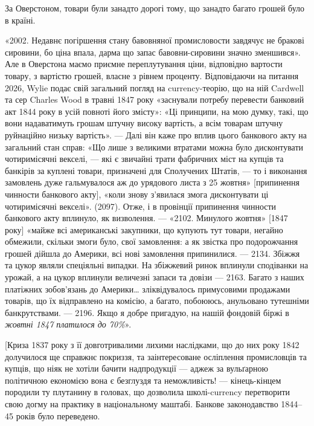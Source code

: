 За Оверстоном, товари були занадто дорогі тому, що занадто багато грошей
було в країні.

«2002. Недавнє погіршення стану бавовняної промисловости завдячує не
бракові сировини, бо ціна впала, дарма що запас бавовни-сировини значно
зменшився». Але в Оверстона маємо приємне переплутування ціни, відповідно
вартости товару, з вартістю грошей, власне з рівнем проценту. Відповідаючи на
питання 2026, Wylie подає свій загальний погляд на currency-теорію, що на
ній Cardwell та сер Charles Wood в травні 1847 року «заснували потребу перевести
банковий акт 1844 року в усій повноті його змісту»: «Ці принципи, на
мою думку, такі, що вони надаватимуть грошам штучну високу вартість, а всім
товарам штучну руйнаційно низьку вартість». — Далі він каже про вплив цього
банкового акту на загальний стан справ: «Що лише з великими втратами можна
було дисконтувати чотиримісячні векселі, — які є звичайні трати фабричних міст
на купців та банкірів за куплені товари, призначені для Сполучених Штатів, —
то і виконання замовлень дуже гальмувалося аж до урядового листа з 25 жовтня»
[припинення чинности банкового акту], «коли знову з’явилася змога дисконтувати
ці чотиримісячні векселі». (2097). Отже, і в провінції припинення чинности
банкового акту вплинуло, як визволення. — «2102. Минулого жовтня»
[1847 року] «майже всі американські закупники, що купують тут товари, негайно
обмежили, скільки змоги було, свої замовлення: а як звістка про подорожчання
грошей дійшла до Америки, всі нові замовлення припинилися. — 2134.
Збіжжя та цукор являли спеціяльні випадки. На збіжжевий ринок вплинули
сподіванки на урожай, а на цукор вплинули величезні запаси та довізи — 2163.
Багато з наших платіжних зобов’язань до Америки\dots{} зліквідувалось примусовими
продажами товарів, що їх відправлено на комісію, а багато, побоююсь,
анульовано тутешніми банкрутствами. — 2196. Якщо я добре пригадую, на нашій
фондовій біржі в \emph{жовтні 1847 платилося до 70\%}».

[Криза 1837 року з її довготривалими лихими наслідками, що до них
року 1842 долучилося ще справжнє покриззя, та заінтересоване осліплення
промисловців та купців, що ніяк не хотіли бачити надпродукції — аджеж за
вульґарною політичною економією вона є безглуздя та неможливість! — кінець-кінцем
породили ту плутанину в головах, що дозволила школі-currency перетворити
свою догму на практику в національному маштабі. Банкове законодавство
1844--45 років було переведено.

